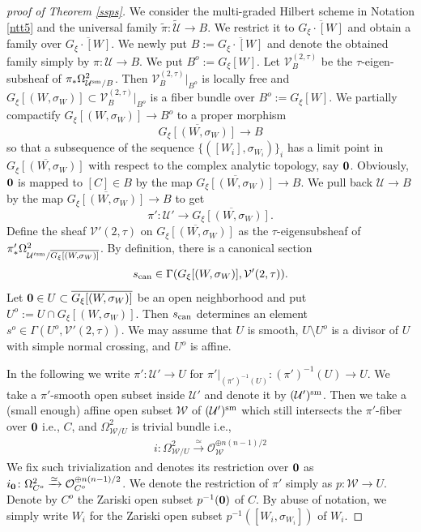 \documentclass[12pt,a4paper]{amsart}
\theoremstyle{remark}
\theoremstyle{definition}
\def\V{\mathcal{V}}
\begin{document}
\begin{proof}[proof of Theorem \ref{ssps}]
We consider the multi-graded Hilbert scheme in Notation 
\ref{ntt5} and the universal family 
$\tilde{\pi}\colon \tilde{\mathcal{U}}\to B$. We restrict 
it 
to $\overline{G_\xi \cdot [W]}$ and obtain a family over 
$\overline{G_\xi \cdot [W]}$. 
We newly put $B:=\overline{G_\xi \cdot [W]}$ 
and denote the obtained family simply by 
$\pi\colon \mathcal{U}\to B$. 
We put $B^o:=G_\xi[W]$. 
Let $\V_B^{(2,\tau)}$ be the 
$\tau$-eigen-subsheaf of $\pi_* \Omega^2_{\mathcal{U}^{\rm sm}/B}$. 
Then $\V_B^{(2,\tau)}|_{B^o}$ is 
locally free and $G_\xi[(W,\sigma_W)]\subset \V_B^{(2,\tau)}|_{B^o}$ 
is a fiber bundle over $B^o:=G_\xi[W]$. 
We partially compactify 
$G_\xi[(W,\sigma_W)] \to B^o$ to a proper morphism 
$$\overline{G_\xi [(W,\sigma_W)]} \to B$$ 
so that a subsequence of the sequence 
$\{([W_i], \sigma_{W_i})\}_i$ 
has a limit point in $\overline{G_\xi [(W,\sigma_W)]}$ 
with respect to the complex analytic topology, 
say ${\bf 0}$. 
Obviously, ${\bf 0}$ is mapped to $[C] \in B$ 
by the map $\overline{G_\xi [(W,\sigma_W)]} \to B$. 
We pull back $\mathcal{U} \to B$ by the map 
$\overline{G_\xi [(W,\sigma_W)]} \to B$ to get 
$$\pi'\colon\mathcal{U}'\to\overline{G_\xi [(W,\sigma_W)]}.$$ Define the sheaf $\V'(2,\tau)$ on $\overline{G_\xi [(W,\sigma_W)]}$ 
as the $\tau$-eigensubsheaf of $\pi'_*\Omega^2_{\mathcal{U}'^{\rm sm}/\overline{G_\xi [(W,\sigma_W)]}}$. 
By definition, there is a canonical section
$$s_{\rm can} \in \Gamma (G_\xi[(W,\sigma_W)],\V'(2,\tau)).$$ 
Let ${\bf 0} \in U \subset \overline{G_\xi [(W,\sigma_W)]}$ 
be an open neighborhood and put $U^o := U \cap  G_\xi[(W,\sigma_W)]$. Then $s_{\rm can}$ 
determines an element $s^o \in \Gamma(U^o,\V'(2,\tau))$. 
We may assume that $U$ is smooth, $U \setminus U^o$ 
is a divisor of $U$ with simple normal crossing, and $U^o$ 
is affine. 

In the following we write $\pi': \mathcal{U}' \to U$ for $\pi' \vert_{(\pi')^{-1}(U)}: (\pi')^{-1}(U) \to U$.  
We take a $\pi'$-smooth open subset inside $\mathcal{U}'$ and denote it by 
$(\mathcal{U}')^{\rm sm}$. Then we take a (small enough) 
affine open subset $\mathcal{W}$ of $(\mathcal{U}')^{\rm sm}$ 
which still intersects the $\pi'$-fiber over ${\bf 0}$ i.e., $C$, and 
$\Omega^2_{\mathcal{W}/U}$ is trivial bundle i.e., 
\begin{align}\label{loctriv}
i\colon \Omega^2_{\mathcal{W}/U}\xrightarrow{\simeq}
\mathcal{O}_{\mathcal{W}}^{\oplus n(n-1)/2}
\end{align}
We fix such trivialization and denotes its restriction 
over ${\bf 0}$ as $i_{\bf 0}\colon \Omega^2_{C^o}
\xrightarrow{\simeq}
\mathcal{O}_{C^o}^{\oplus n(n-1)/2}$. 
We denote the restriction of $\pi'$ simply as $p\colon  
\mathcal{W}\to U$. 
Denote by $C^o$ the Zariski open subset $p^{-1}({\bf 0})$ of $C$. By abuse of notation, we simply write $W_i$ for the Zariski open subset $p^{-1}([W_i, \sigma_{W_i}])$ of $W_i$.  


\end{proof}
\end{document}
